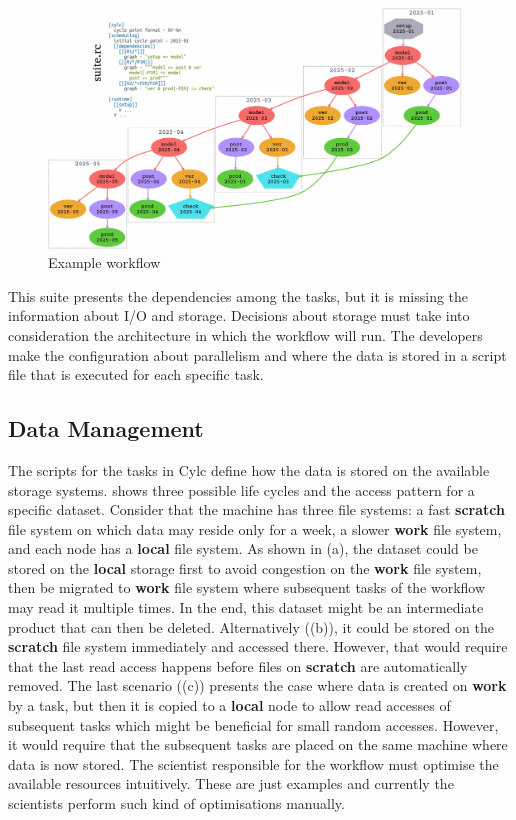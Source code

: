 \documentclass[a4paper]{article}
\begin{document}
\begin{figure}[H]
  \centering
  \includegraphics[width=0.9\columnwidth]{cylc1}
  \caption{Example workflow\cite{8675433}}
  \label{fig:cylc}
\end{figure}

This suite presents the dependencies among the tasks, but it is missing the information about I/O and storage.
Decisions about storage must take into consideration the architecture in which the workflow will run.
The developers make the configuration about parallelism and where the data is stored in a script file that is executed for each specific task.

\subsection{Data Management}

The scripts for the tasks in Cylc define how the data is stored on the available storage systems.
 shows three possible life cycles and the access pattern for a specific dataset.
Consider that the machine has three file systems: a fast \textbf{scratch} file system on which data may reside only for a week, a slower \textbf{work} file system, and each node has a \textbf{local} file system.
As shown in (a), the dataset could be stored on the \textbf{local} storage first to avoid congestion on the \textbf{work} file system, then be migrated to \textbf{work} file system where subsequent tasks of the workflow may read it multiple times.
In the end, this dataset might be an intermediate product that can then be deleted.
Alternatively ((b)), it could be stored on the \textbf{scratch} file system immediately and accessed there.
However, that would require that the last read access happens before files on \textbf{scratch} are automatically removed.
The last scenario ((c)) presents the case where data is created on \textbf{work} by a task, but then it is copied to a \textbf{local} node to allow read accesses of subsequent tasks which might be beneficial for small random accesses.
However, it would require that the subsequent tasks are placed on the same machine where data is now stored.
The scientist responsible for the workflow must optimise the available resources intuitively.
These are just examples and currently the scientists perform such kind of optimisations manually.
\end{document}
